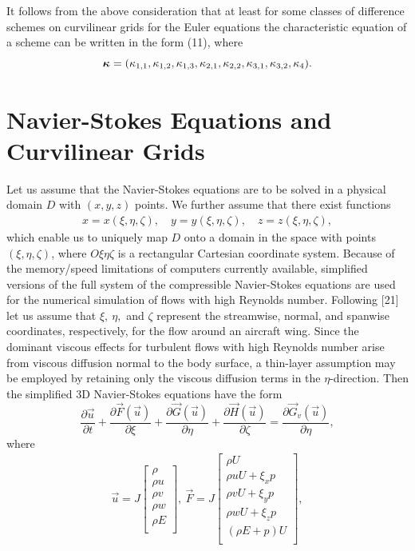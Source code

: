    It follows from the above consideration that at least for some classes of
difference schemes on curvilinear grids for the Euler equations the
characteristic equation of a scheme can be written in the form (11), where
$$\mbox{\boldmath$\kappa$\unboldmath}=(\kappa_{1,1},\kappa_{1,2},\kappa_{1,3},
\kappa_{2,1},\kappa_{2,2},\kappa_{3,1},\kappa_{3,2},\kappa_4).$$

\newpage
\section{Navier-Stokes Equations \newline
and Curvilinear Grids}
\hspace{6mm}

   Let us assume that the Navier-Stokes equations are to be solved in a
physical domain $D$ with $(x,y,z)$ points. We further assume that
there exist functions
\begin{eqnarray}
x=x(\xi,\eta,\zeta),\quad y=y(\xi,\eta,\zeta),\quad z=z(\xi,\eta,\zeta),
\end{eqnarray}
which enable us to uniquely map $D$ onto a domain in the space with
points $(\xi,\eta,\zeta)$, where $O\xi \eta \zeta$ is a rectangular
Cartesian coordinate system. Because of
the memory/speed limitations of computers currently available,
simplified versions of the full system of the compressible Navier-Stokes
equations are used for the numerical
simulation of flows with high Reynolds number. Following [21] let us
assume that $\xi,~\eta,$ and $\zeta$ represent
the streamwise, normal, and spanwise coordinates, respectively, for the
flow around an aircraft wing. Since the dominant viscous effects for turbulent
flows with high Reynolds number arise from viscous diffusion normal to the body
surface, a thin-layer assumption may be employed by retaining only the
viscous diffusion terms in the $\eta$-direction.
Then the simplified 3D Navier-Stokes equations have the form
\begin{equation}
\frac{\partial \vec{u}}{\partial t} +
\frac{\partial \vec{F}(\vec{u})}{
\partial \xi} + \frac{\partial \vec{G}(\vec{u})}{\partial \eta} +
\frac{\partial \vec{H}(\vec{u})}{\partial \zeta} =
\frac{\partial \vec{G}_v(\vec{u})}{\partial \eta},
\end{equation}
where
\begin{eqnarray*}
\vec{u} = J \left[ \begin{array}{c}
\rho\\
\rho u\\
\rho v\\
\rho w\\
\rho E\\
\end{array} \right ],~\vec{F} = J \left[ \begin{array}{c}
\rho U\\
\rho uU + \xi_x p\\
\rho vU + \xi_y p\\
\rho wU + \xi_z p\\
(\rho E + p)U\\
\end{array} \right ],
\end{eqnarray*}
